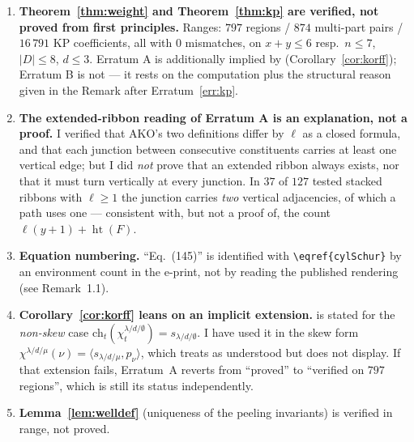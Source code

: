 \documentclass[11pt]{article}
\theoremstyle{plain}
\theoremstyle{definition}
\theoremstyle{remark}
\DeclareMathOperator{\hgt}{ht}
\begin{document}
\begin{enumerate}
\item \textbf{Theorem~\ref{thm:weight} and Theorem~\ref{thm:kp} are verified, not proved from first
principles.} Ranges: $797$ regions / $874$ multi-part pairs / $16\,791$ KP coefficients, all with
$0$ mismatches, on $x+y\le6$ resp.\ $n\le7$, $|D|\le8$, $d\le3$. Erratum A is additionally implied by
\cite[\eqref{eq:korffi}]{K19} (Corollary~\ref{cor:korff}); Erratum B is not --- it rests on the
computation plus the structural reason given in the Remark after Erratum~\ref{err:kp}.
\item \textbf{The extended-ribbon reading of Erratum A is an explanation, not a proof.} I verified
that AKO's two definitions differ by $\ell$ as a closed formula, and that each junction between
consecutive constituents carries at least one vertical edge; but I did \emph{not} prove that an
extended ribbon always exists, nor that it must turn vertically at every junction. In $37$ of $127$
tested stacked ribbons with $\ell\ge1$ the junction carries \emph{two} vertical adjacencies, of which
a path uses one --- consistent with, but not a proof of, the count $\ell(y+1)+\hgt(F)$.
\item \textbf{Equation numbering.} ``Eq.~(145)'' is identified with \verb|\eqref{cylSchur}| by an
environment count in the e-print, not by reading the published rendering (see Remark~1.1).
\item \textbf{Corollary~\ref{cor:korff} leans on an implicit extension.}
\cite[\texttt{cor:cylchi2cylschur}]{K19} is stated for the \emph{non-skew} case
$\mathrm{ch}_t(\chi^{\lambda/d/\emptyset}_t)=s_{\lambda/d/\emptyset}$. I have used it in the skew
form $\chi^{\lambda/d/\mu}(\nu)=\langle s_{\lambda/d/\mu},p_\nu\rangle$, which \cite{K19} treats as
understood but does not display. If that extension fails, Erratum~A reverts from ``proved'' to
``verified on $797$ regions'', which is still its status independently.
\item \textbf{Lemma~\ref{lem:welldef}} (uniqueness of the peeling invariants) is verified in range,
not proved.
\end{enumerate}
\end{document}
